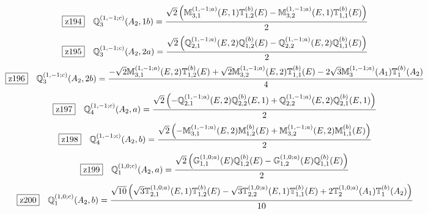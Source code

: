 \documentclass[fleqn,10pt,landscape]{jsarticle}
\begin{document}
\begin{dmath*}
\hspace*{3mm}\fbox{z194}\quad \mathbb{Q}_{3}^{(1,-1;c)}(A_{2},1b)=\frac{\sqrt{2} \left(\mathbb{M}_{3,1}^{(1,-1;a)}(E,1) \mathbb{T}_{1,2}^{(b)}(E) - \mathbb{M}_{3,2}^{(1,-1;a)}(E,1) \mathbb{T}_{1,1}^{(b)}(E)\right)}{2}
\end{dmath*}
\begin{dmath*}
\hspace*{3mm}\fbox{z195}\quad \mathbb{Q}_{3}^{(1,-1;c)}(A_{2},2a)=\frac{\sqrt{2} \left(\mathbb{Q}_{2,1}^{(1,-1;a)}(E,2) \mathbb{Q}_{1,2}^{(b)}(E) - \mathbb{Q}_{2,2}^{(1,-1;a)}(E,2) \mathbb{Q}_{1,1}^{(b)}(E)\right)}{2}
\end{dmath*}
\begin{dmath*}
\hspace*{3mm}\fbox{z196}\quad \mathbb{Q}_{3}^{(1,-1;c)}(A_{2},2b)=\frac{- \sqrt{2} \mathbb{M}_{3,1}^{(1,-1;a)}(E,2) \mathbb{T}_{1,2}^{(b)}(E) + \sqrt{2} \mathbb{M}_{3,2}^{(1,-1;a)}(E,2) \mathbb{T}_{1,1}^{(b)}(E) - 2 \sqrt{3} \mathbb{M}_{3}^{(1,-1;a)}(A_{1}) \mathbb{T}_{1}^{(b)}(A_{2})}{4}
\end{dmath*}
\begin{dmath*}
\hspace*{3mm}\fbox{z197}\quad \mathbb{Q}_{4}^{(1,-1;c)}(A_{2},a)=\frac{\sqrt{2} \left(- \mathbb{Q}_{2,1}^{(1,-1;a)}(E,2) \mathbb{Q}_{2,2}^{(b)}(E,1) + \mathbb{Q}_{2,2}^{(1,-1;a)}(E,2) \mathbb{Q}_{2,1}^{(b)}(E,1)\right)}{2}
\end{dmath*}
\begin{dmath*}
\hspace*{3mm}\fbox{z198}\quad \mathbb{Q}_{4}^{(1,-1;c)}(A_{2},b)=\frac{\sqrt{2} \left(- \mathbb{M}_{3,1}^{(1,-1;a)}(E,2) \mathbb{M}_{1,2}^{(b)}(E) + \mathbb{M}_{3,2}^{(1,-1;a)}(E,2) \mathbb{M}_{1,1}^{(b)}(E)\right)}{2}
\end{dmath*}
\begin{dmath*}
\hspace*{3mm}\fbox{z199}\quad \mathbb{Q}_{1}^{(1,0;c)}(A_{2},a)=\frac{\sqrt{2} \left(\mathbb{G}_{1,1}^{(1,0;a)}(E) \mathbb{Q}_{1,2}^{(b)}(E) - \mathbb{G}_{1,2}^{(1,0;a)}(E) \mathbb{Q}_{1,1}^{(b)}(E)\right)}{2}
\end{dmath*}
\begin{dmath*}
\hspace*{3mm}\fbox{z200}\quad \mathbb{Q}_{1}^{(1,0;c)}(A_{2},b)=\frac{\sqrt{10} \left(\sqrt{3} \mathbb{T}_{2,1}^{(1,0;a)}(E,1) \mathbb{T}_{1,2}^{(b)}(E) - \sqrt{3} \mathbb{T}_{2,2}^{(1,0;a)}(E,1) \mathbb{T}_{1,1}^{(b)}(E) + 2 \mathbb{T}_{2}^{(1,0;a)}(A_{1}) \mathbb{T}_{1}^{(b)}(A_{2})\right)}{10}
\end{dmath*}
\end{document}
